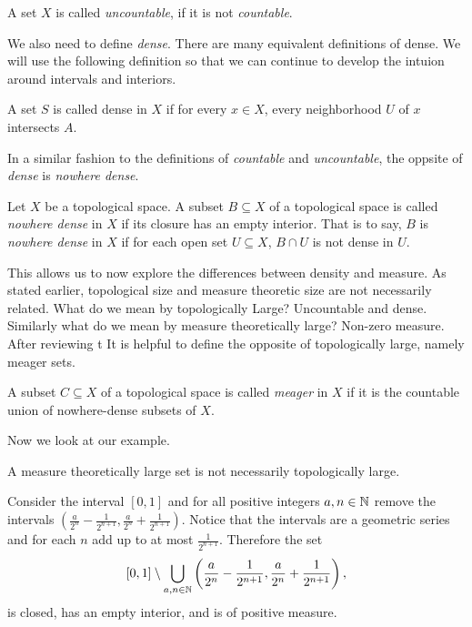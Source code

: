 {\begin{definition}[Uncountable]
    A set $X$ is called \textit{uncountable}, if it is not \textit{countable}.
\end{definition}

We also need to define \textit{dense}.  There are many equivalent definitions of dense.  We will use the following definition so that we can continue to develop the intuion around intervals and interiors. 

\begin{definition}[Dense]
    A set $S$ is called dense in $X$ if for every $x \in X$, every neighborhood $U$ of $x$ intersects $A$.  
\end{definition}


In a similar fashion to the definitions of \textit{countable} and \textit{uncountable}, the oppsite of \textit{dense} is \textit{nowhere dense}.

\begin{definition}  Let $X$ be a topological space.  A subset $B \subseteq X$ of a topological space is called \textit{nowhere dense} in $X$ if its closure has an empty interior.  That is to say, $B$ is \textit{nowhere dense} in $X$ if for each open set $U\subseteq X$, $B\cap U$ is not dense in $U$.      
\end{definition}


This allows us to now explore the differences between density and measure.  As stated earlier, topological size and measure theoretic size are not necessarily related.  What do we mean by topologically Large? Uncountable and dense.  Similarly what do we mean by measure theoretically large?  Non-zero measure.  After reviewing t It is helpful to define the opposite of topologically large, namely meager sets.



\begin{definition}[Meager]  A subset $C \subseteq X$ of a topological space is called \textit{meager} in $X$ if it is the countable union of nowhere-dense subsets of $X$.    
\end{definition}
Now we look at our example.  
\begin{example}A measure theoretically large set is not necessarily topologically large.

Consider the interval $[0,1]$ and for all positive integers $a,n \in \mathbb{N}$ remove the intervals $(\frac{a}{2^n} - \frac{1}{2^{n+1}},\frac{a}{2^n} + \frac{1}{2^{n+1}})$.  Notice that the intervals are a geometric series and for each $n$ add up to at most $\frac{1}{2^{n+1}}$.  Therefore the set 
$$[0,1] \setminus \bigcup_{a,n \in \mathbb{N}} \left(\frac{a}{2^n} - \frac{1}{2^{n+1}},\frac{a}{2^n} + \frac{1}{2^{n+1}}\right),$$
is closed, has an empty interior, and is of positive measure.  
\end{example}

}
